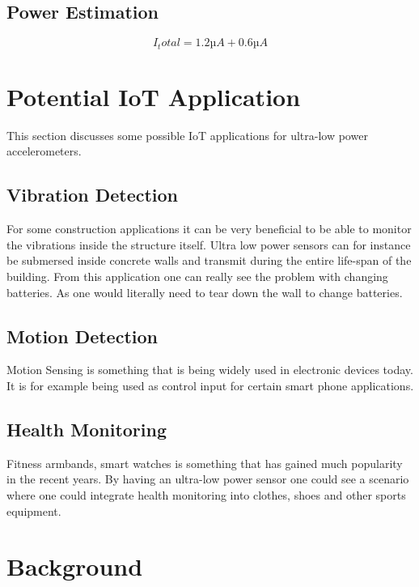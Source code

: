\subsection{Power Estimation}

\begin{equation}
I_total = 1.2µA + 0.6µA
\end{equation}

\section{Potential IoT Application}

This section discusses some possible IoT applications for ultra-low power accelerometers. 

\subsection{Vibration Detection}

For some construction applications it can be very beneficial to be able to monitor the vibrations inside the structure itself. Ultra low power sensors can for instance be submersed inside concrete walls and transmit during the entire life-span of the building. From this application one can really see the problem with changing batteries. As one would literally need to tear down the wall to change batteries. 

\subsection{Motion Detection}

Motion Sensing is something that is being widely used in electronic devices today. It is for example being used as control input for certain smart phone applications.

\subsection{Health Monitoring}

Fitness armbands, smart watches is something that has gained much popularity in the recent years. By having an ultra-low power sensor one could see a scenario where one could integrate health monitoring into clothes, shoes and other sports equipment. 


\section{Background}
